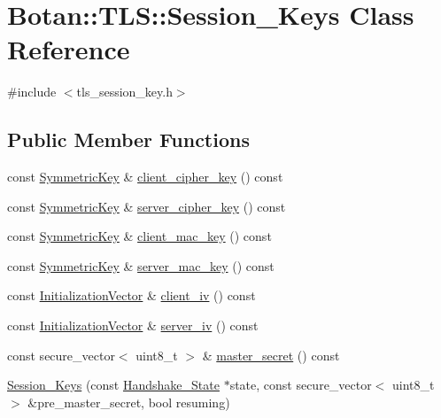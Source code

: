 \hypertarget{class_botan_1_1_t_l_s_1_1_session___keys}{}\section{Botan\+:\+:T\+LS\+:\+:Session\+\_\+\+Keys Class Reference}
\label{class_botan_1_1_t_l_s_1_1_session___keys}


{\ttfamily \#include $<$tls\+\_\+session\+\_\+key.\+h$>$}

\subsection*{Public Member Functions}
\begin{DoxyCompactItemize}
\item 
const \mbox{\hyperlink{namespace_botan_a89cf6c3513428f524454d01830221a88}{Symmetric\+Key}} \& \mbox{\hyperlink{class_botan_1_1_t_l_s_1_1_session___keys_abcf288cea8831273fc95a9744e70d68b}{client\+\_\+cipher\+\_\+key}} () const
\item 
const \mbox{\hyperlink{namespace_botan_a89cf6c3513428f524454d01830221a88}{Symmetric\+Key}} \& \mbox{\hyperlink{class_botan_1_1_t_l_s_1_1_session___keys_a53aedead940ee203e7480a80c08318c9}{server\+\_\+cipher\+\_\+key}} () const
\item 
const \mbox{\hyperlink{namespace_botan_a89cf6c3513428f524454d01830221a88}{Symmetric\+Key}} \& \mbox{\hyperlink{class_botan_1_1_t_l_s_1_1_session___keys_a01e452a544ad91cda683c74cc7eec21c}{client\+\_\+mac\+\_\+key}} () const
\item 
const \mbox{\hyperlink{namespace_botan_a89cf6c3513428f524454d01830221a88}{Symmetric\+Key}} \& \mbox{\hyperlink{class_botan_1_1_t_l_s_1_1_session___keys_a451ac996c71f1110883ca51fc5c85e2f}{server\+\_\+mac\+\_\+key}} () const
\item 
const \mbox{\hyperlink{namespace_botan_a2fbf5195ffe701adcabb1f8c41bfc557}{Initialization\+Vector}} \& \mbox{\hyperlink{class_botan_1_1_t_l_s_1_1_session___keys_ae948da8c53c2303521b058e3a5a4c879}{client\+\_\+iv}} () const
\item 
const \mbox{\hyperlink{namespace_botan_a2fbf5195ffe701adcabb1f8c41bfc557}{Initialization\+Vector}} \& \mbox{\hyperlink{class_botan_1_1_t_l_s_1_1_session___keys_a3b0a61516654fbd61723568f2ed5bdec}{server\+\_\+iv}} () const
\item 
const secure\+\_\+vector$<$ uint8\+\_\+t $>$ \& \mbox{\hyperlink{class_botan_1_1_t_l_s_1_1_session___keys_a94bb969a64e883fb85be1c90b1f31966}{master\+\_\+secret}} () const
\item 
\mbox{\hyperlink{class_botan_1_1_t_l_s_1_1_session___keys_ae5f58ecc560f772088e8a967736f1e84}{Session\+\_\+\+Keys}} (const \mbox{\hyperlink{class_botan_1_1_t_l_s_1_1_handshake___state}{Handshake\+\_\+\+State}} $\ast$state, const secure\+\_\+vector$<$ uint8\+\_\+t $>$ \&pre\+\_\+master\+\_\+secret, bool resuming)
\end{DoxyCompactItemize}


